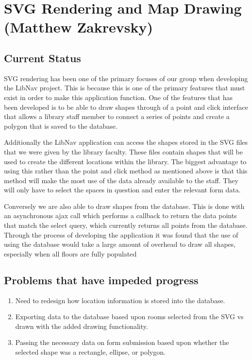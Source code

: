 \documentclass[letterpaper,10pt,titlepage, onecolumn, compsoc]{IEEEtran}
\begin{document}
\section{SVG Rendering and Map Drawing (Matthew Zakrevsky)}
\subsection{Current Status}
SVG rendering has been one of the primary focuses of our group when developing the LibNav project. This is because this is one of the primary features that must exist in order to make this application function. One of the features that has been developed  is to be able to draw shapes through of a point and click interface that allows a library staff member to connect a series of points and create a polygon that is saved to the database. 

Additionally the LibNav application can access the shapes stored in the SVG files that we were given by the library faculty.  These files contain shapes that will be used to create the different locations within the library. The biggest advantage to using this rather than the point and click method as mentioned above is that this method will make the most use of the data already available to the staff. They will only have to select the spaces in question and enter the relevant form data. 

Conversely we are also able to draw shapes from the database. This is done with an asynchronous ajax call which performs a callback to return the data points that match the select query, which currently returns all points from the database.  Through the process of developing the application it was found that the use of using the database would take a large amount of overhead to draw all shapes, especially when all floors are fully populated

\subsection{Problems that have impeded progress}
\begin{enumerate}
	\item Need to redesign how location information is stored into the database. 
    \item Exporting data to the database based upon rooms selected from the SVG vs drawn with the added drawing functionality.
    \item Passing the necessary data on form submission based upon whether the selected shape was a rectangle, ellipse, or polygon.
\end{enumerate}
\end{document}
